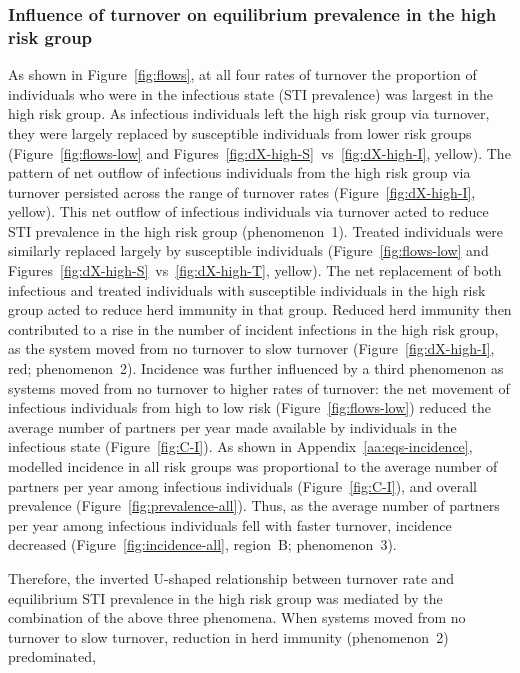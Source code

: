 \subsubsection{Influence of turnover on equilibrium prevalence in the high risk group}
\label{sss:res-prev-high}
As shown in Figure~\ref{fig:flows}, at all four rates of turnover
the proportion of individuals who were in the infectious state (STI prevalence)
was largest in the high risk group.
As infectious individuals left the high risk group via turnover,
they were largely replaced by susceptible individuals from lower risk groups
(Figure~\ref{fig:flows-low} and
Figures~\ref{fig:dX-high-S}~vs~\ref{fig:dX-high-I}, yellow).
The pattern of net outflow of infectious individuals
from the high risk group via turnover
persisted across the range of turnover rates
(Figure~\ref{fig:dX-high-I}, yellow).
This net outflow of infectious individuals via turnover
acted to reduce STI prevalence in the high risk group
(phenomenon~1).
Treated individuals were similarly replaced largely by susceptible individuals
(Figure~\ref{fig:flows-low} and
Figures~\ref{fig:dX-high-S}~vs~\ref{fig:dX-high-T}, yellow).
The net replacement of both infectious and treated individuals with susceptible individuals
in the high risk group acted to reduce herd immunity in that group.
Reduced herd immunity then contributed to a rise in
the number of incident infections in the high risk group,
as the system moved from no turnover to slow turnover
(Figure~\ref{fig:dX-high-I}, red; phenomenon~2).
Incidence was further influenced by a third phenomenon
as systems moved from no turnover to higher rates of turnover:
the net movement of infectious individuals
from high to low risk (Figure~\ref{fig:flows-low})
reduced the average number of partners per year made available by
individuals in the infectious state (Figure~\ref{fig:C-I}).
As shown in Appendix~\ref{aa:eqs-incidence},
modelled incidence in all risk groups was proportional to
the average number of partners per year among infectious individuals
(Figure~\ref{fig:C-I}),
and overall prevalence
(Figure~\ref{fig:prevalence-all}).
Thus, as the average number of partners per year among infectious individuals
fell with faster turnover, incidence decreased
(Figure~\ref{fig:incidence-all}, region~B; phenomenon~3).
\par
Therefore, the inverted U-shaped relationship between turnover rate
and equilibrium STI prevalence in the high risk group was mediated
by the combination of the above three phenomena.
When systems moved from no turnover to slow turnover,
reduction in herd immunity (phenomenon~2) predominated,
